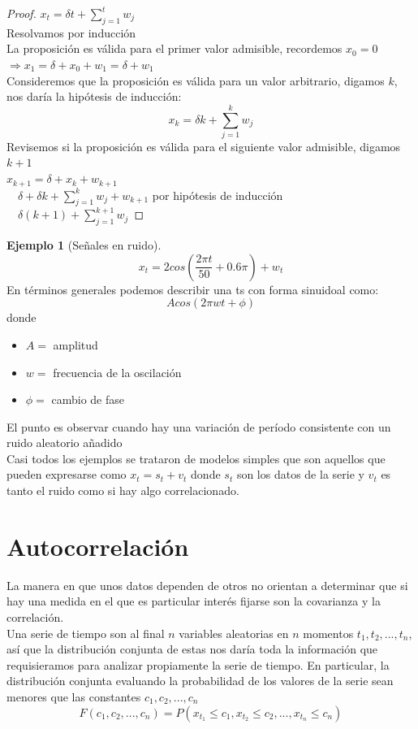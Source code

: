 \documentclass[11pt,a4paper,oneside]{report}
\theoremstyle{definition}
\newtheorem{ejemplo}[definicion]{Ejemplo}
\theoremstyle{plain}
\theoremstyle{remark}
\begin{document}
\begin{proof}
  $x_t=\delta t + \sum_{j = 1}^{t}w_j$\\
  Resolvamos por inducción\\
  La proposición es válida para el primer valor admisible, recordemos $x_0=0$\\
  $\Rightarrow x_1=\delta + x_0+w_1=\delta + w_1$\\
  Consideremos que la proposición es válida para un valor arbitrario, digamos $k$, nos
  daría la hipótesis de inducción:
  \[x_k=\delta k + \sum_{j = 1}^{k}w_j\]
  Revisemos si la proposición es válida para el siguiente valor admisible, digamos $k+1$\\
  $x_{k+1}=\delta + x_k + w_{k+1}$\\
  $\quad \delta + \delta k + \sum_{j = 1}^{k}w_j + w_{k+1} $ por hipótesis de inducción\\
  $\quad \delta (k+1) + \sum_{j = 1}^{k+1}w_j$
\end{proof}  

\begin{ejemplo}[Señales en ruido]
\[x_t=2cos(\frac{2\pi t}{50}+0.6\pi)+w_t \]
En términos generales podemos describir una ts con forma sinuidoal como:
\[Acos(2\pi wt + \phi)\]
donde
\begin{itemize}
  \item $A=$ amplitud
  \item $w=$ frecuencia de la oscilación
  \item $\phi=$ cambio de fase 
\end{itemize}
\end{ejemplo}
El punto es observar cuando hay una variación de período consistente con un ruido aleatorio añadido\\
Casi todos los ejemplos se trataron de modelos simples que son aquellos que pueden expresarse
como $x_t=s_t+v_t$ donde $s_t$ son los datos de la serie y $v_t$ es tanto el ruido como si hay algo
correlacionado. 

\section{Autocorrelación}
La manera en que unos datos dependen de otros no orientan a determinar que si hay una medida en 
el que es particular interés fijarse son la covarianza y la correlación. \\
Una serie de tiempo son al final $n$ variables aleatorias en $n$ momentos $t_1, t_2,...,t_n$,
así que la distribución conjunta de estas nos daría toda la información que requisieramos para
analizar propiamente la serie de tiempo. En particular, la distribución conjunta evaluando
la probabilidad de los valores de la serie sean menores que las constantes $c_1,c_2,...,c_n$
\[F(c_1,c_2,...,c_n)=P(x_{t_1}\leq c_1,x_{t_2}\leq c_2,...,x_{t_n}\leq c_n)\]
\end{document}
